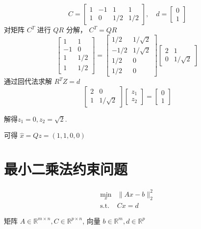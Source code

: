 \begin{example}
    $$
C=\left[\begin{array}{cccc}
1 & -1 & 1 & 1 \\
1 & 0 & 1 / 2 & 1 / 2
\end{array}\right], \quad d=\left[\begin{array}{l}
0 \\
1
\end{array}\right]
$$
对矩阵 $ C^{T} $ 进行 $ Q R $ 分解， $ C^{T}=Q R $
$$
\left[\begin{array}{cc}
1 & 1 \\
-1 & 0 \\
1 & 1 / 2 \\
1 & 1 / 2
\end{array}\right]=\left[\begin{array}{cc}
1 / 2 & 1 / \sqrt{2} \\
-1 / 2 & 1 / \sqrt{2} \\
1 / 2 & 0 \\
1 / 2 & 0
\end{array}\right]\left[\begin{array}{cc}
2 & 1 \\
0 & 1 / \sqrt{2}
\end{array}\right]
$$
通过回代法求解 $ R^{T} Z=d $
$$
\left[\begin{array}{cc}
2 & 0 \\
1 & 1 / \sqrt{2}
\end{array}\right]\left[\begin{array}{l}
z_{1} \\
z_{2}
\end{array}\right]=\left[\begin{array}{l}
0 \\
1
\end{array}\right]
$$

解得$
 z_{1}=0, z_{2}=\sqrt{2}
$.

可得 $ \hat{x}=Q z=(1,1,0,0) $
\end{example}

\section{最小二乘法约束问题}

\begin{problem}[分段多项式拟合问题]
    $$\begin{aligned}
        \min _{x} &\|A x-b\|_{2}^{2} \\
        \text{s.t.} & Cx =d 
    \end{aligned}$$

    矩阵 $ {A} \in \mathbb{R}^{m \times n}, {C} \in \mathbb{R}^{p \times n} $, 向量 $ {b} \in \mathbb{R}^{m}, d \in \mathbb{R}^{p} $
\end{problem}



